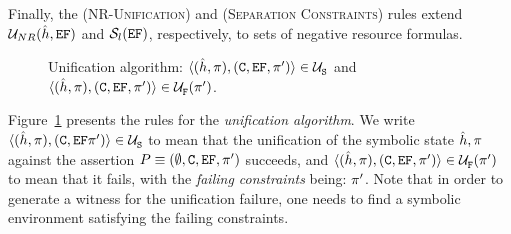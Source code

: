 Finally, the (\textsc{NR-Unification}) and (\textsc{Separation Constraints}) rules extend ${\mathcal{U}}_{NR}(\hat{h}, \mathtt{EF})$ and ${\mathcal{S}}_{l}(\mathtt{EF})$, respectively, to sets of negative resource formulas.

\begin{figure}[t!]
{\scriptsize
\centering
{}}
\vspace*{-0.6cm}
\caption{Unification algorithm: {\small $\langle (\hat{h}, \pi), (\mathtt{C}, \mathtt{EF}, \pi') \rangle \in {\mathcal{U}}_{\mathtt{S}}^{}$}
and {\small $\langle (\hat{h}, \pi), (\mathtt{C}, \mathtt{EF}, \pi') \rangle \in {\mathcal{U}}_{\mathtt{F}}^{}(\pi')$}.\label{unification:algorithm}}
\vspace*{-0.3cm}
\end{figure}


Figure~\ref{unification:algorithm} presents the rules for the \emph{unification algorithm}. 
We write $\langle (\hat{h}, \pi), (\mathtt{C}, \mathtt{EF} \pi') \rangle \in {\mathcal{U}}_{\mathtt{S}}^{}$ to mean that the unification of 
the symbolic state $\hat{h}, \pi$ against the assertion $P \equiv (\emptyset, \mathtt{C}, \mathtt{EF}, \pi')$ 
succeeds, and $\langle (\hat{h}, \pi), (\mathtt{C}, \mathtt{EF}, \pi') \rangle \in {\mathcal{U}}_{\mathtt{F}}^{}(\pi')$ to mean that it
fails, with the \emph{failing constraints} being: $\pi'$. Note that in order to generate a 
witness for the unification failure, one needs to find a symbolic environment satisfying the 
failing constraints.

